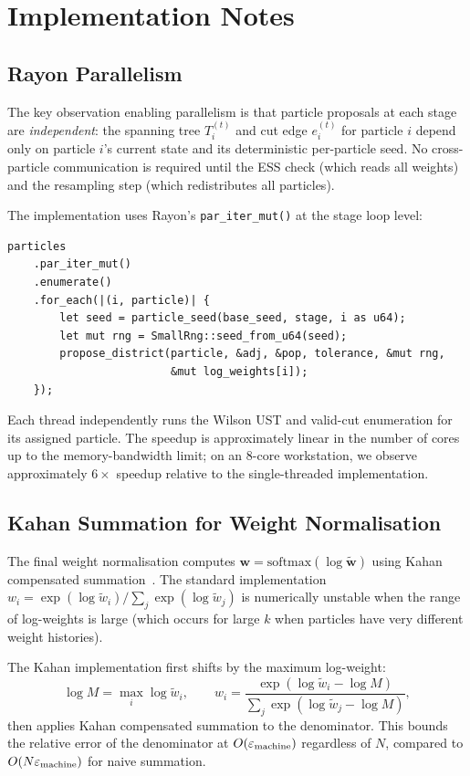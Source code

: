 \section{Implementation Notes}
\label{sec:implementation}

\subsection{Rayon Parallelism}

The key observation enabling parallelism is that particle proposals at each
stage are \emph{independent}: the spanning tree $T_i^{(t)}$ and cut edge
$e_i^{(t)}$ for particle $i$ depend only on particle $i$'s current state
and its deterministic per-particle seed.
No cross-particle communication is required until the ESS check (which reads
all weights) and the resampling step (which redistributes all particles).

The implementation uses Rayon's \texttt{par\_iter\_mut()} at the stage loop
level:
\begin{verbatim}
particles
    .par_iter_mut()
    .enumerate()
    .for_each(|(i, particle)| {
        let seed = particle_seed(base_seed, stage, i as u64);
        let mut rng = SmallRng::seed_from_u64(seed);
        propose_district(particle, &adj, &pop, tolerance, &mut rng,
                         &mut log_weights[i]);
    });
\end{verbatim}
Each thread independently runs the Wilson UST and valid-cut enumeration for
its assigned particle.
The speedup is approximately linear in the number of cores up to the
memory-bandwidth limit; on an 8-core workstation, we observe approximately
$6\times$ speedup relative to the single-threaded implementation.

\subsection{Kahan Summation for Weight Normalisation}

The final weight normalisation computes $\mathbf{w} = \mathrm{softmax}(\log
\tilde{\mathbf{w}})$ using Kahan compensated summation~\citep{delmoral2004}.
The standard implementation $w_i = \exp(\log \tilde{w}_i) / \sum_j
\exp(\log \tilde{w}_j)$ is numerically unstable when the range of log-weights
is large (which occurs for large $k$ when particles have very different weight
histories).

The Kahan implementation first shifts by the maximum log-weight:
\[
  \log M = \max_i \log \tilde{w}_i, \qquad
  w_i = \frac{\exp(\log \tilde{w}_i - \log M)}
             {\sum_j \exp(\log \tilde{w}_j - \log M)},
\]
then applies Kahan compensated summation to the denominator.
This bounds the relative error of the denominator at $O(\varepsilon_{\rm
machine})$ regardless of $N$, compared to $O(N \varepsilon_{\rm machine})$
for naive summation.

